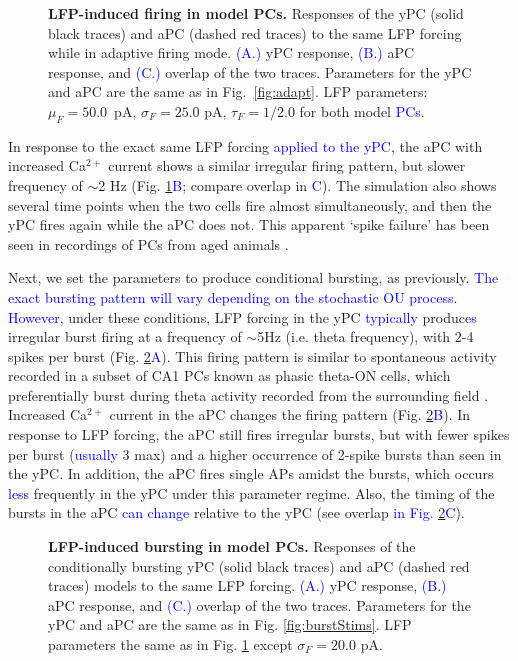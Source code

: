 \documentclass[10pt,letterpaper]{article}
\newcommand{\Ca}{Ca$^{2+}$}
\newcommand{\edit}[1]{\textcolor{blue}{#1}}
\begin{document}
\begin{figure}[h!]
\centering
\caption{{\bf LFP-induced firing in model PCs.}
Responses of the yPC (solid black traces) and aPC (dashed red traces) to the same LFP forcing while in adaptive firing mode. \edit{(A.)} yPC response, \edit{(B.)} aPC response, and \edit{(C.)} overlap of the two traces. Parameters for the yPC and aPC are the same as in Fig.~\ref{fig:adapt}. LFP parameters: $\mu_{F}=50.0$~pA, $\sigma_{F}=25.0$ pA, $\tau_{F}=1/2.0$ for both model \edit{PCs}.}
\label{fig:LFPadaptive}
\end{figure}

In response to the exact same LFP forcing \edit{applied to the yPC}, the aPC with increased {\Ca} current shows a similar irregular firing pattern, but slower frequency of $\sim$2 Hz (Fig. \ref{fig:LFPadaptive}\edit{B}; compare overlap in \edit{C}). The simulation also shows several time points when the two cells fire almost simultaneously, and then the yPC fires again while the aPC does not. This apparent `spike failure' has been seen in recordings of PCs from aged animals \cite{gant2009action}. 

Next, we set the parameters to produce conditional bursting, as previously. \edit{The exact bursting pattern will vary depending on the stochastic OU process. However,} under these conditions, LFP forcing in the yPC \edit{typically} produce\edit{s} irregular burst firing at a frequency of $\sim$5Hz (i.e. theta frequency), with 2-4 spikes per burst (Fig. \ref{fig:LFPbursting}\edit{A}). This firing pattern is similar to spontaneous activity recorded in a subset of CA1 PCs known as phasic theta-ON cells, which preferentially burst during theta activity recorded from the surrounding field \cite{bland2005heterogeneity,colom1987state}. Increased {\Ca} current in the aPC changes the firing pattern (Fig. \ref{fig:LFPbursting}\edit{B}). In response to LFP forcing, the aPC still fires irregular bursts, but with fewer spikes per burst (\edit {usually} 3 max) and a higher occurrence of 2-spike bursts than seen in the yPC. In addition, the aPC fires single APs amidst the bursts, which occurs \edit{less} frequently in the yPC under this parameter regime. Also, the timing of the bursts in the aPC \edit{can change} relative to the yPC (see overlap \edit{in Fig. \ref{fig:LFPbursting}C}).

\begin{figure}[h!]
\centering
\caption{{\bf LFP-induced bursting in model PCs.}
Responses of the conditionally bursting yPC (solid black traces) and aPC (dashed red traces) models to the same LFP forcing. \edit{(A.)} yPC response, \edit{(B.)} aPC response, and \edit{(C.)} overlap of the two traces. Parameters for the yPC and aPC are the same as in Fig. \ref{fig:burstStims}. LFP parameters the same as in Fig. \ref{fig:LFPadaptive} except $\sigma_{F}=20.0$ pA.}
\label{fig:LFPbursting}
\end{figure}
\end{document}
